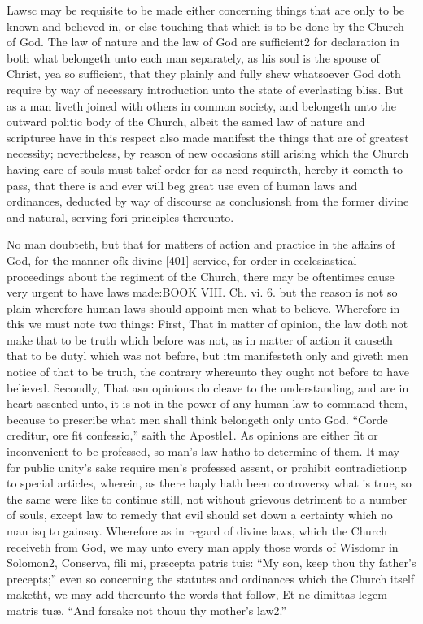 Lawsc may be requisite to be made either concerning things that are only to be known and believed in, or else touching that which is to be done by the Church of God. The law of nature and the law of God are sufficient2 for declaration in both what belongeth unto each man separately, as his soul is the spouse of Christ, yea so sufficient, that they plainly and fully shew whatsoever God doth require by way of necessary introduction unto the state of everlasting bliss. But as a man liveth joined with others in common society, and belongeth unto the outward politic body of the Church, albeit the samed law of nature and scripturee have in this respect also made manifest the things that are of greatest necessity; nevertheless, by reason of new occasions still arising which the Church having care of souls must takef order for as need requireth, hereby it cometh to pass, that there is and ever will beg great use even of human laws and ordinances, deducted by way of discourse as conclusionsh from the former divine and natural, serving fori principles thereunto.

No man doubteth, but that for matters of action and practice in the affairs of God, for the manner ofk divine [401] service, for order in ecclesiastical proceedings about the regiment of the Church, there may be oftentimes cause very urgent to have laws made:BOOK VIII. Ch. vi. 6. but the reason is not so plain wherefore human laws should appoint men what to believe. Wherefore in this we must note two things: First, That in matter of opinion, the law doth not make that to be truth which before was not, as in matter of action it causeth that to be dutyl which was not before, but itm manifesteth only and giveth men notice of that to be truth, the contrary whereunto they ought not before to have believed. Secondly, That asn opinions do cleave to the understanding, and are in heart assented unto, it is not in the power of any human law to command them, because to prescribe what men shall think belongeth only unto God. “Corde creditur, ore fit confessio,” saith the Apostle1. As opinions are either fit or inconvenient to be professed, so man’s law hatho to determine of them. It may for public unity’s sake require men’s professed assent, or prohibit contradictionp to special articles, wherein, as there haply hath been controversy what is true, so the same were like to continue still, not without grievous detriment to a number of souls, except law to remedy that evil should set down a certainty which no man isq to gainsay. Wherefore as in regard of divine laws, which the Church receiveth from God, we may unto every man apply those words of Wisdomr in Solomon2, Conserva, fili mi, præcepta patris tuis: “My son, keep thou thy father’s precepts;” even so concerning the statutes and ordinances which the Church itself maketht, we may add thereunto the words that follow, Et ne dimittas legem matris tuæ, “And forsake not thouu thy mother’s law2.”

